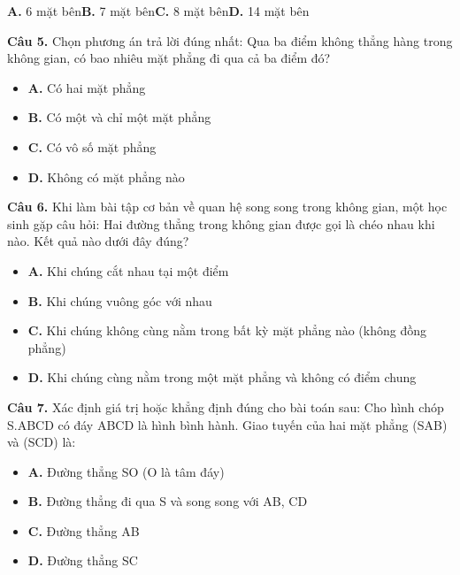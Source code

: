 \documentclass[11pt,a4paper]{article}
\begin{document}
\hspace*{1.5em}\textbf{A.} 6 mặt bên\quad\quad \textbf{B.} 7 mặt bên\quad\quad \textbf{C.} 8 mặt bên\quad\quad \textbf{D.} 14 mặt bên\par\vspace{2pt}
\textbf{\color{primary} Câu 5.} Chọn phương án trả lời đúng nhất: Qua ba điểm không thẳng hàng trong không gian, có bao nhiêu mặt phẳng đi qua cả ba điểm đó?\par
\begin{itemize}\setlength{\itemsep}{1pt}\setlength{\parskip}{0pt}
  \item[] \textbf{A.} Có hai mặt phẳng
  \item[] \textbf{B.} Có một và chỉ một mặt phẳng
  \item[] \textbf{C.} Có vô số mặt phẳng
  \item[] \textbf{D.} Không có mặt phẳng nào
\end{itemize}\vspace{2pt}
\textbf{\color{primary} Câu 6.} Khi làm bài tập cơ bản về quan hệ song song trong không gian, một học sinh gặp câu hỏi: Hai đường thẳng trong không gian được gọi là chéo nhau khi nào. Kết quả nào dưới đây đúng?\par
\begin{itemize}\setlength{\itemsep}{1pt}\setlength{\parskip}{0pt}
  \item[] \textbf{A.} Khi chúng cắt nhau tại một điểm
  \item[] \textbf{B.} Khi chúng vuông góc với nhau
  \item[] \textbf{C.} Khi chúng không cùng nằm trong bất kỳ mặt phẳng nào (không đồng phẳng)
  \item[] \textbf{D.} Khi chúng cùng nằm trong một mặt phẳng và không có điểm chung
\end{itemize}\vspace{2pt}
\textbf{\color{primary} Câu 7.} Xác định giá trị hoặc khẳng định đúng cho bài toán sau: Cho hình chóp S.ABCD có đáy ABCD là hình bình hành. Giao tuyến của hai mặt phẳng (SAB) và (SCD) là:\par
\begin{itemize}\setlength{\itemsep}{1pt}\setlength{\parskip}{0pt}
  \item[] \textbf{A.} Đường thẳng SO (O là tâm đáy)
  \item[] \textbf{B.} Đường thẳng đi qua S và song song với AB, CD
  \item[] \textbf{C.} Đường thẳng AB
  \item[] \textbf{D.} Đường thẳng SC
\end{itemize}\vspace{2pt}
\end{document}
